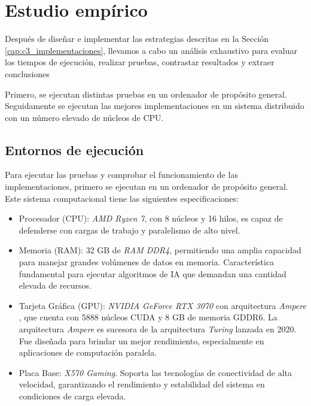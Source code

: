 


\chapter{Estudio empírico}
\label{cap:c4_estudio}	
Después de diseñar e implementar las estrategias descritas en la Sección \ref{cap:c3_implementaciones}, llevamos a cabo un análisis exhaustivo para evaluar los tiempos de ejecución, realizar pruebas, contrastar resultados y extraer conclusiones

Primero, se ejecutan distintas pruebas en un ordenador de propósito general. Seguidamente se ejecutan las mejores implementaciones en un sistema distribuido con un número elevado de núcleos de CPU. 

\section{Entornos de ejecución}

Para ejecutar las pruebas y comprobar el funcionamiento de las implementaciones, primero se ejecutan en un ordenador de propósito general. Este sistema computacional tiene las siguientes especificaciones:

\begin{itemize}
	\item Procesador (CPU): \textit{AMD Ryzen 7}, con 8 núcleos y 16 hilos, es capaz de defenderse con cargas de trabajo y paralelismo de alto nivel.
	\item Memoria (RAM): 32 GB de \textit{RAM DDR4}, permitiendo una amplia capacidad para manejar grandes volúmenes de datos en memoria. Característica fundamental para ejecutar algoritmos de IA que demandan una cantidad elevada de recursos.
	\item Tarjeta Gráfica (GPU): \textit{NVIDIA GeForce RTX 3070} con arquitectura \textit{Ampere} \cite{pool2020accelerating}, que cuenta con 5888 núcleos CUDA y 8 GB de memoria GDDR6. La arquitectura \textit{Ampere} es sucesora de la arquitectura \textit{Turing} lanzada en 2020. Fue diseñada para brindar un mejor rendimiento, especialmente en aplicaciones de computación paralela.
	\item Placa Base: \textit{X570 Gaming}. Soporta las tecnologías de conectividad de alta velocidad, garantizando el rendimiento y estabilidad del sistema en condiciones de carga elevada.
\end{itemize}

